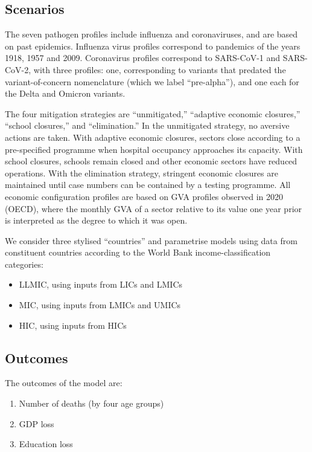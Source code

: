 \documentclass[
]{article}
\providecommand{\tightlist}{%
  \setlength{\itemsep}{0pt}\setlength{\parskip}{0pt}}
\begin{document}
\hypertarget{scenarios}{%
\subsection{Scenarios}\label{scenarios}}

The seven pathogen profiles include influenza and coronaviruses, and are based on past epidemics. Influenza virus profiles correspond to pandemics of the years 1918, 1957 and 2009. Coronavirus profiles correspond to SARS-CoV-1 and SARS-CoV-2, with three profiles: one, corresponding to variants that predated the variant-of-concern nomenclature (which we label ``pre-alpha''), and one each for the Delta and Omicron variants.

The four mitigation strategies are ``unmitigated,'' ``adaptive economic closures,'' ``school closures,'' and ``elimination.'' In the unmitigated strategy, no aversive actions are taken. With adaptive economic closures, sectors close according to a pre-specified programme when hospital occupancy approaches its capacity. With school closures, schools remain closed and other economic sectors have reduced operations. With the elimination strategy, stringent economic closures are maintained until case numbers can be contained by a testing programme. All economic configuration profiles are based on GVA profiles observed in 2020 (OECD), where the monthly GVA of a sector relative to its value one year prior is interpreted as the degree to which it was open.

We consider three stylised ``countries'' and parametrise models using data from constituent countries according to the World Bank income-classification categories:

\begin{itemize}
\tightlist
\item
  LLMIC, using inputs from LICs and LMICs
\item
  MIC, using inputs from LMICs and UMICs
\item
  HIC, using inputs from HICs
\end{itemize}

\hypertarget{outcomes}{%
\subsection{Outcomes}\label{outcomes}}

The outcomes of the model are:

\begin{enumerate}
\def\labelenumi{\arabic{enumi}.}
\tightlist
\item
  Number of deaths (by four age groups)
\item
  GDP loss
\item
  Education loss
\end{enumerate}
\end{document}
